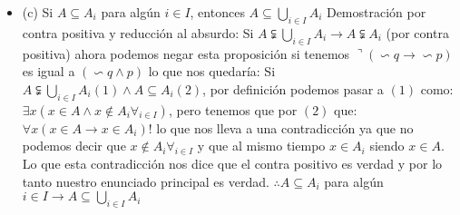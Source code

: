 \begin{itemize}
 	
	\item (c) Si $A \subseteq A_i$ para algún $i \in I$, entonces $A \subseteq \bigcup_{i \in I} A_i$\newline
	Demostración por contra positiva y reducción al absurdo: \newline
	Si $A \subsetneqq \bigcup_{i \in I}A_i \rightarrow A \subsetneqq A_i$ (por contra positiva) ahora podemos negar esta proposición si tenemos $\urcorner (\backsim q \rightarrow \backsim p)$ es igual a $(\backsim q \wedge p)$ lo que nos quedaría:\newline
	Si $A \subsetneqq \bigcup_{i \in I}A_i (1) \wedge A \subseteq A_i (2) $, por definición podemos pasar a $(1)$ como:\newline
	$\exists x (x \in A \wedge x \notin A_i \forall_{i \in I})$, pero tenemos que por $(2)$ que:\newline
	$\forall x (x \in A \rightarrow x \in A_i)!$ lo que nos lleva a una contradicción ya que no podemos decir que $x \notin A_i \forall_{i \in I}$ y que al mismo tiempo $x \in A_i$  siendo $x \in A$. Lo que esta contradicción nos dice que el contra positivo es verdad y por lo tanto nuestro enunciado principal es verdad.\newline
	$\therefore A \subseteq A_i$ para algún $i \in I \rightarrow A \subseteq  \bigcup_{i \in I} A_i$
\end{itemize}